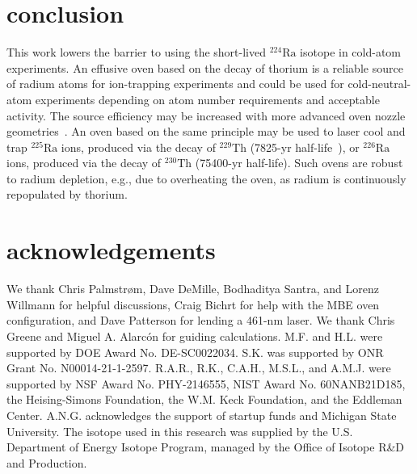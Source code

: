\documentclass[
 reprint,
 amsmath,amssymb,
 aps,
 prr,
 superscriptaddress,
]{revtex4-2}
\newcommand{\iso}[2]{\ensuremath{^{#2}\mathrm{#1}}}
\begin{document}
\section{conclusion}

This work lowers the barrier to using the short-lived \iso{Ra}{224} isotope in cold-atom experiments.  An effusive oven based on the decay of thorium is a reliable source of radium atoms for ion-trapping experiments and could be used for cold-neutral-atom experiments depending on atom number requirements and acceptable activity.  The source efficiency may be increased with more advanced oven nozzle geometries~\cite{Senaratne2015}.   An oven based on the same principle may be used to laser cool and trap \iso{Ra}{225} ions, produced via the decay of \iso{Th}{229} (7825-yr half-life~\cite{Essex2018}), or \iso{Ra}{226} ions, produced via the decay of \iso{Th}{230} (\SI{75400}{}-yr half-life). Such ovens are robust to radium depletion, e.g., due to overheating the oven, as radium is continuously repopulated by thorium.   

\section*{acknowledgements}

We thank Chris Palmstr\o m, Dave DeMille, Bodhaditya Santra, and Lorenz Willmann for helpful discussions, Craig Bichrt for help with the MBE oven configuration, and Dave Patterson for lending a 461-nm laser. We thank Chris Greene and Miguel A. Alarcón for guiding calculations. M.F. and H.L. were supported by DOE Award No. DE-SC0022034. S.K. was supported by ONR Grant No. N00014-21-1-2597. R.A.R., R.K., C.A.H., M.S.L., and A.M.J. were supported by NSF Award No. PHY-2146555,  NIST Award No. 60NANB21D185, the Heising-Simons Foundation, the W.M. Keck Foundation, and the Eddleman Center. A.N.G. acknowledges the support of startup funds and Michigan State University. The isotope used in this research was supplied by the U.S. Department of Energy Isotope Program, managed by the Office of Isotope R\&D and Production.



\end{document}
